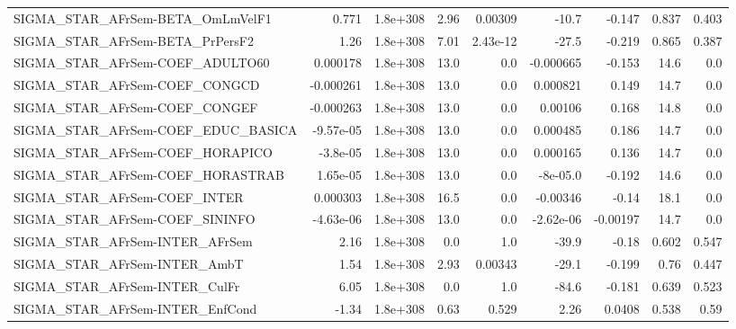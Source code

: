 \begin{tabular}{lrrrrrrrr}
SIGMA\_STAR\_AFrSem-BETA\_OmLmVelF1      &       0.771 &     1.8e+308 &    2.96 &  0.00309 &      -10.7 &      -0.147 &        0.837 &         0.403 \\
SIGMA\_STAR\_AFrSem-BETA\_PrPersF2       &        1.26 &     1.8e+308 &    7.01 & 2.43e-12 &      -27.5 &      -0.219 &        0.865 &         0.387 \\
SIGMA\_STAR\_AFrSem-COEF\_ADULTO60       &    0.000178 &     1.8e+308 &    13.0 &      0.0 &  -0.000665 &      -0.153 &         14.6 &           0.0 \\
SIGMA\_STAR\_AFrSem-COEF\_CONGCD         &   -0.000261 &     1.8e+308 &    13.0 &      0.0 &   0.000821 &       0.149 &         14.7 &           0.0 \\
SIGMA\_STAR\_AFrSem-COEF\_CONGEF         &   -0.000263 &     1.8e+308 &    13.0 &      0.0 &    0.00106 &       0.168 &         14.8 &           0.0 \\
SIGMA\_STAR\_AFrSem-COEF\_EDUC\_BASICA    &   -9.57e-05 &     1.8e+308 &    13.0 &      0.0 &   0.000485 &       0.186 &         14.7 &           0.0 \\
SIGMA\_STAR\_AFrSem-COEF\_HORAPICO       &    -3.8e-05 &     1.8e+308 &    13.0 &      0.0 &   0.000165 &       0.136 &         14.7 &           0.0 \\
SIGMA\_STAR\_AFrSem-COEF\_HORASTRAB      &    1.65e-05 &     1.8e+308 &    13.0 &      0.0 &   -8e-05.0 &      -0.192 &         14.6 &           0.0 \\
SIGMA\_STAR\_AFrSem-COEF\_INTER          &    0.000303 &     1.8e+308 &    16.5 &      0.0 &   -0.00346 &       -0.14 &         18.1 &           0.0 \\
SIGMA\_STAR\_AFrSem-COEF\_SININFO        &   -4.63e-06 &     1.8e+308 &    13.0 &      0.0 &  -2.62e-06 &    -0.00197 &         14.7 &           0.0 \\
SIGMA\_STAR\_AFrSem-INTER\_AFrSem        &        2.16 &     1.8e+308 &     0.0 &      1.0 &      -39.9 &       -0.18 &        0.602 &         0.547 \\
SIGMA\_STAR\_AFrSem-INTER\_AmbT          &        1.54 &     1.8e+308 &    2.93 &  0.00343 &      -29.1 &      -0.199 &         0.76 &         0.447 \\
SIGMA\_STAR\_AFrSem-INTER\_CulFr         &        6.05 &     1.8e+308 &     0.0 &      1.0 &      -84.6 &      -0.181 &        0.639 &         0.523 \\
SIGMA\_STAR\_AFrSem-INTER\_EnfCond       &       -1.34 &     1.8e+308 &    0.63 &    0.529 &       2.26 &      0.0408 &        0.538 &          0.59 \\

\end{tabular}
